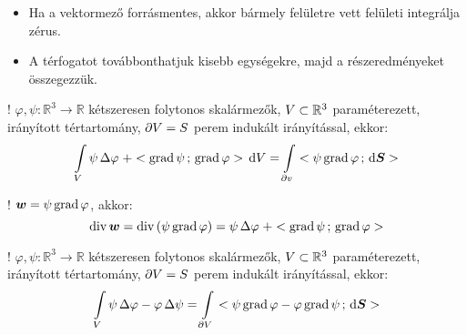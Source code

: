 \documentclass[main.tex]{subfiles}
\begin{document}
\begin{itemize}
  \item Ha a vektormező forrásmentes, akkor bármely
        felületre vett felületi integrálja zérus.

  \item A térfogatot továbbonthatjuk kisebb egységekre,
        majd a részeredményeket összegezzük.
\end{itemize}




! $\varphi, \psi : \mathbb{R}^3 \rightarrow \mathbb{R}$
kétszeresen folytonos skalármezők, ${V} \subset \mathbb{R}^3$
paraméterezett, irányított tértartomány,
$\partial {V} = {S}$
perem indukált irányítással, ekkor:
\begin{equation*}
  \int \limits_{{V}}
  \psi \, \Delta \varphi \; + < \operatorname{grad} \psi \, ; \, \operatorname{grad} \varphi >
  \, \mathrm{d} {V}
  =
  \int \limits_{\partial {v}}
  < \psi \operatorname{grad} \varphi \, ; \, \mathrm{d} \boldsymbol{S} >
\end{equation*}




! $\boldsymbol{w} = \psi \operatorname{grad} \varphi$, akkor:
\begin{equation*}
  \operatorname{div} \boldsymbol{w}
  =
  \operatorname{div} \left(
  \psi \operatorname{grad} \varphi
  \right)
  =
  \psi \, \Delta \varphi \; + < \operatorname{grad} \psi \, ; \, \operatorname{grad} \varphi >
\end{equation*}



! $\varphi, \psi : \mathbb{R}^3 \rightarrow \mathbb{R}$
kétszeresen folytonos skalármezők, ${V} \subset \mathbb{R}^3$
paraméterezett, irányított tértartomány,
$\partial {V} = {S}$
perem indukált irányítással, ekkor:
\begin{equation*}
  \int \limits_{{V}}
  \psi \, \Delta \varphi - \varphi \, \Delta \psi
  =
  \int \limits_{\partial {V}}
  < 
    \psi \operatorname{grad} \varphi - \varphi \operatorname{grad} \psi
   \, ; \, \mathrm{d} \boldsymbol{S} >
\end{equation*}
\end{document}
